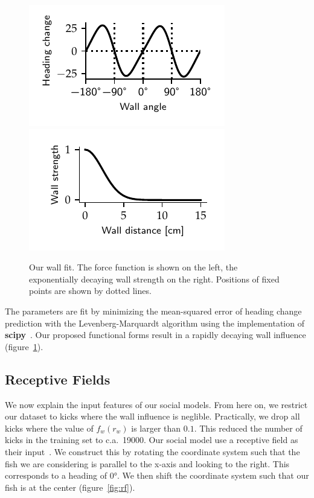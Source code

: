 \documentclass[nobib, a4paper]{tufte-handout}
\begin{document}
\begin{figure}[htb]
 \centering
 \includegraphics{wall_odd}~%
 \includegraphics{wall_force} 
 \caption{Our wall fit.
   The force function is shown on the left, the exponentially decaying wall strength on the right.
 Positions of fixed points are shown by dotted lines.}
\label{fig:wall-fit}
\end{figure}

The parameters are fit by minimizing the mean-squared error of heading change prediction with the Levenberg-Marquardt algorithm using the implementation of \textbf{scipy}~\autocite{scipy}.
Our proposed functional forms result in a rapidly decaying wall influence (figure~\ref{fig:wall-fit}).

\subsection{Receptive Fields}
We now explain the input features of our social models.
From here on, we restrict our dataset to kicks where the wall influence is neglible.
Practically, we drop all kicks where the value of \(f_w(r_w)\) is larger than $0.1$.
This reduced the number of kicks in the training set to c.a.\ 19000.
Our social model use a receptive field as their input~\autocite{discreteModes}.
We construct this by rotating the coordinate system such that the fish we are considering is parallel to the x-axis and looking to the right.
This corresponds to a heading of \ang{0}.
We then shift the coordinate system such that our fish is at the center (figure~\ref{fig:rf}).
\end{document}
